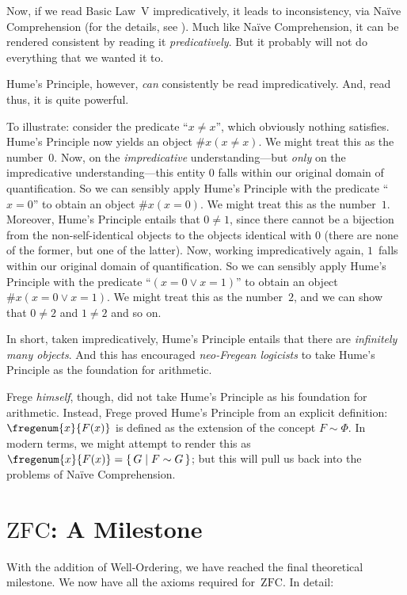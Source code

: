 \documentclass[10pt,a4paper]{article}
\makeatletter
\theoremstyle{plain}
\theoremstyle{definition}
\theoremstyle{remark}
\newcommand*{\olfileid}[3]{}
\newcommand*{\olsection}[1]{\section*{#1}}
\newcommand{\olref}{\@ifnextchar[{\olref@i}{\olref@final}}
\def\olref@i[#1]{\@ifnextchar[{\olref@ii}{\olref@final}}
\def\olref@ii[#1]{\@ifnextchar[{\olref@iii}{\olref@final}}
\def\olref@iii[#1]{\olref@final}
\def\olref@final#1{\ref{#1}}
\providecommand{\ZFC}{\mathrm{ZFC}}
\providecommand{\Setabs}[2]{\{\, #1 \mid #2 \,\}}
\makeatother
\begin{document}
Now, if we read Basic Law~V impredicatively, it leads to
inconsistency, via Na\"ive Comprehension (for the details, see
\olref[story][blv]{sec}). Much like Na\"ive Comprehension, it can be
rendered consistent by reading it \emph{predicatively}. But it
probably will not do everything that we wanted it to. 

Hume's Principle, however, \emph{can} consistently be read
impredicatively. And, read thus, it is quite powerful.

To illustrate: consider the predicate ``$x \neq x$'', which obviously
nothing satisfies. Hume's Principle now yields an object $\# x( x\neq
x)$. We might treat this as the number~$0$. Now, on the
\emph{impredicative} understanding---but \emph{only} on the
impredicative understanding---this entity $0$ falls within our
original domain of quantification. So we can sensibly apply Hume's
Principle with the predicate ``$x = 0$'' to obtain an object $\#x (x =
0)$. We might treat this as the number~$1$. Moreover, Hume's Principle
entails that $0 \neq 1$, since there cannot be a bijection from the
non-self-identical objects to the objects identical with $0$ (there
are none of the former, but one of the latter). Now, working
impredicatively again, $1$~falls within our original domain of
quantification. So we can sensibly apply Hume's Principle with the
predicate ``$(x = 0 \lor x = 1)$'' to obtain an object $\#x(x = 0 \lor
x = 1)$. We might treat this as the number~$2$, and we can show that
$0\neq 2$ and $1 \neq 2$ and so on. 

In short, taken impredicatively, Hume's Principle entails that there
are \emph{infinitely many objects}. And this has encouraged
\emph{neo-Fregean logicists} to take Hume's Principle as the
foundation for arithmetic. 

Frege \emph{himself}, though, did not take Hume's Principle as his
foundation for arithmetic. Instead, Frege proved Hume's Principle from
an explicit definition: $\fregenum{x}{F(x)}$ is defined as the extension of
the concept $F \sim \Phi$. In modern terms, we might attempt to render
this as $\fregenum{x}{F(x)} = \Setabs{G}{F \sim G}$; but this will pull us
back into the problems of Na\"ive Comprehension.



\olfileid{sth}{cardinals}{zfc}	
\olsection{$\ZFC$: A Milestone}

With the addition of Well-Ordering, we have reached the final
theoretical milestone. We now have all the axioms required for~$\ZFC$.
In detail:
\end{document}
